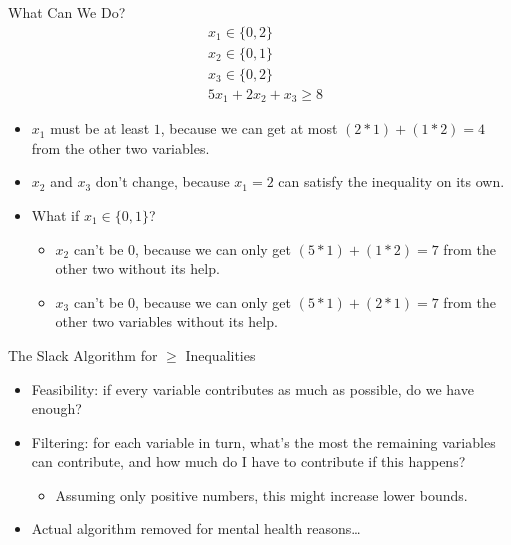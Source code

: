 \documentclass[aspectratio=169,compress,10pt]{beamer}
\begin{document}
\begin{frame}{What Can We Do?}
    \vspace*{-1em}
    \begin{align*}
        & x_1 \in \{ 0, 2 \} \\
        & x_2 \in \{ 0, 1 \} \\
        & x_3 \in \{ 0, 2 \} \\
        & 5x_1 + 2x_2 + x_3 \ge 8
    \end{align*}

    \begin{itemize}
        \item <2-> $x_1$ must be at least $1$, because we can get at most $(2 *
            1) + (1 * 2) = 4$ from the other two variables.
        \item <3-> $x_2$ and $x_3$ don't change, because $x_1 = 2$ can satisfy the inequality on its own.
        \item <4-> What if $x_1 \in \{ 0, 1 \}$?
            \begin{itemize}
            \item <5-> $x_2$ can't be $0$, because we can only get $(5 * 1) + (1 * 2) = 7$ from the other two
                without its help.
            \item <6-> $x_3$ can't be $0$, because we can only get $(5 * 1) + (2 * 1) = 7$ from the other two
                variables without its help.
            \end{itemize}
    \end{itemize}
\end{frame}

\begin{frame}{The Slack Algorithm for $\ge$ Inequalities}
    \begin{itemize}
        \item Feasibility: if every variable contributes as much as possible,
            do we have enough?
        \item Filtering: for each variable in turn, what's the most the
            remaining variables can contribute, and how much do I have to
            contribute if this happens?
            \begin{itemize}
                \item Assuming only positive numbers, this might increase lower bounds.
            \end{itemize}
        \item Actual algorithm removed for mental health reasons\ldots
    \end{itemize}
\end{frame}
\end{document}
